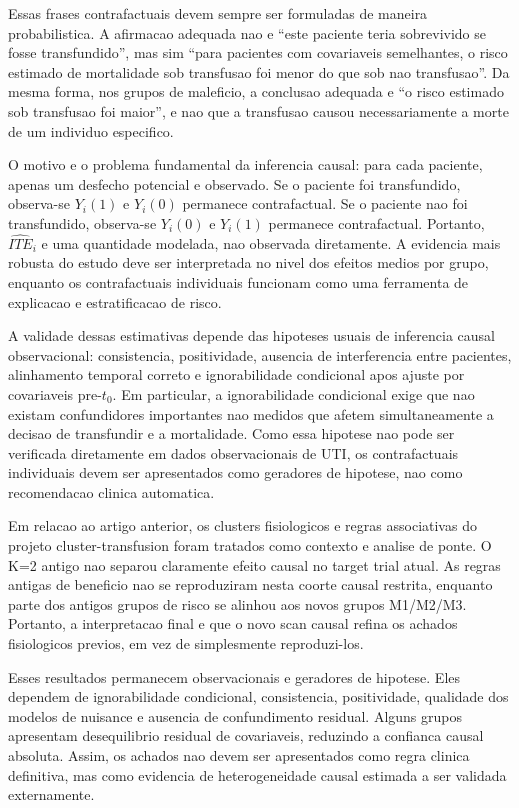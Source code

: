 Essas frases contrafactuais devem sempre ser formuladas de maneira probabilistica. A afirmacao adequada nao e ``este paciente teria sobrevivido se fosse transfundido'', mas sim ``para pacientes com covariaveis semelhantes, o risco estimado de mortalidade sob transfusao foi menor do que sob nao transfusao''. Da mesma forma, nos grupos de maleficio, a conclusao adequada e ``o risco estimado sob transfusao foi maior'', e nao que a transfusao causou necessariamente a morte de um individuo especifico.

O motivo e o problema fundamental da inferencia causal: para cada paciente, apenas um desfecho potencial e observado. Se o paciente foi transfundido, observa-se $Y_i(1)$ e $Y_i(0)$ permanece contrafactual. Se o paciente nao foi transfundido, observa-se $Y_i(0)$ e $Y_i(1)$ permanece contrafactual. Portanto, $\widehat{ITE}_i$ e uma quantidade modelada, nao observada diretamente. A evidencia mais robusta do estudo deve ser interpretada no nivel dos efeitos medios por grupo, enquanto os contrafactuais individuais funcionam como uma ferramenta de explicacao e estratificacao de risco.

A validade dessas estimativas depende das hipoteses usuais de inferencia causal observacional: consistencia, positividade, ausencia de interferencia entre pacientes, alinhamento temporal correto e ignorabilidade condicional apos ajuste por covariaveis pre-$t_0$. Em particular, a ignorabilidade condicional exige que nao existam confundidores importantes nao medidos que afetem simultaneamente a decisao de transfundir e a mortalidade. Como essa hipotese nao pode ser verificada diretamente em dados observacionais de UTI, os contrafactuais individuais devem ser apresentados como geradores de hipotese, nao como recomendacao clinica automatica.

Em relacao ao artigo anterior, os clusters fisiologicos e regras associativas do projeto cluster-transfusion foram tratados como contexto e analise de ponte. O K=2 antigo nao separou claramente efeito causal no target trial atual. As regras antigas de beneficio nao se reproduziram nesta coorte causal restrita, enquanto parte dos antigos grupos de risco se alinhou aos novos grupos M1/M2/M3. Portanto, a interpretacao final e que o novo scan causal refina os achados fisiologicos previos, em vez de simplesmente reproduzi-los.

Esses resultados permanecem observacionais e geradores de hipotese. Eles dependem de ignorabilidade condicional, consistencia, positividade, qualidade dos modelos de nuisance e ausencia de confundimento residual. Alguns grupos apresentam desequilibrio residual de covariaveis, reduzindo a confianca causal absoluta. Assim, os achados nao devem ser apresentados como regra clinica definitiva, mas como evidencia de heterogeneidade causal estimada a ser validada externamente.
